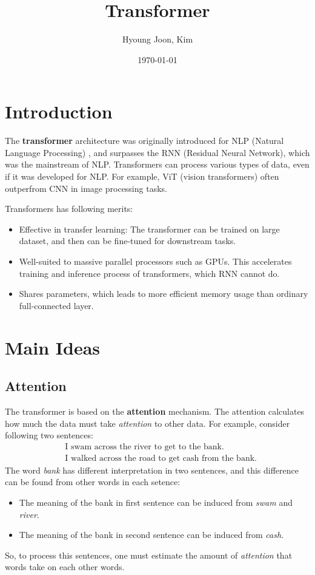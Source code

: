 \documentclass{article}
\title{Transformer}
\author{Hyoung Joon, Kim}
\date{\today}
\begin{document}
\maketitle
\tableofcontents
\newpage

\section{Introduction}
    The \textbf{transformer} architecture was originally introduced for NLP (Natural Language Processing)
    , and surpasses the RNN (Residual Neural Network), which was the mainstream of NLP. Transformers can
    process various types of data, even if it was developed for NLP. For example, ViT (vision transformers)
    often outperfrom CNN in image processing tasks.

    Transformers has following merits:
    \begin{itemize}
        \item Effective in transfer learning: The transformer can be trained on large dataset, and then can be fine-tuned for downstream tasks.
        \item Well-suited to massive parallel processors such as GPUs. This accelerates training and inference process of transformers, which RNN cannot do.
        \item Shares parameters, which leads to more efficient memory usage than ordinary full-connected layer.
    \end{itemize}

\section{Main Ideas}
    \subsection{Attention}
        The transformer is based on the \textbf{attention} mechanism. The attention calculates how much the data must
        take \emph{attention} to other data. For example, consider following two sentences:
        \begin{align*}
            &\text{I swam across the river to get to the bank.} \\
            &\text{I walked across the road to get cash from the bank.}
        \end{align*}
        The word \emph{bank} has different interpretation in two sentences, and this difference
        can be found from other words in each setence:
        \begin{itemize}
            \item The meaning of the bank in first sentence can be induced from \emph{swam} and \emph{river}.
            \item The meaning of the bank in second sentence can be induced from \emph{cash}.
        \end{itemize}
        So, to process this sentences, one must estimate the amount of \emph{attention} that words take on each other words.
        
\end{document}
